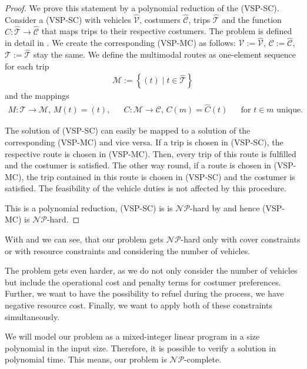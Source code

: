 \begin{proof}

We prove this statement by a polynomial reduction of the (VSP-SC). Consider a (VSP-SC) with vehicles $\hat{\mathcal{V}}$, costumers $\hat{\mathcal{C}}$, trips $\hat{\mathcal{T}}$ and the function $\hat{C}:\hat{\mathcal{T}}\to\hat{\mathcal{C}}$ that maps trips to their respective costumers. The problem is defined in detail in \cite[pp. 5-8]{Kaiser_Knoll}. We create the corresponding (VSP-MC) as follows: $\mathcal{V}:=\hat{\mathcal{V}}$, $\mathcal{C}:=\hat{\mathcal{C}}$, $\mathcal{T}:=\hat{\mathcal{T}}$ stay the same. We define the multimodal routes as one-element sequence for each trip
\begin{align*}
	\mathcal{M}:=\left\{(t)\mid t\in\hat{\mathcal{T}}\right\}
\end{align*}
and the mappings
\begin{align*}
	M:\mathcal{T}\to\mathcal{M} \text{, } M(t) = (t), && C:\mathcal{M}\to\mathcal{C} \text{, } C(m) = \hat{C}(t) && \text{for } t\in m \text{ unique.}
\end{align*}

The solution of (VSP-SC) can easily be mapped to a solution of the corresponding (VSP-MC) and vice versa. If a trip is chosen in (VSP-SC), the respective route is chosen in (VSP-MC). Then, every trip of this route is fulfilled and the costumer is satisfied. The other way round, if a route is chosen in (VSP-MC), the trip contained in this route is chosen in (VSP-SC) and the costumer is satisfied. The feasibility of the vehicle duties is not affected by this procedure.

This is a polynomial reduction, (VSP-SC) is is $\mathcal{NP}$-hard by  and hence (VSP-MC) is $\mathcal{NP}$-hard.

\end{proof}

With  and  we can see, that our problem gets $\mathcal{NP}$-hard only with cover constraints or with resource constraints and considering the number of vehicles.

The problem gets even harder, as we do not only consider the number of vehicles but include the operational cost and penalty terms for costumer preferences. Further, we want to have the possibility to refuel during the process, \ie we have negative resource cost. Finally, we want to apply both of these constraints simultaneously. 

We will model our problem as a mixed-integer linear program in a size polynomial in the input size. Therefore, it is possible to verify a solution in polynomial time. This means, our problem is $\mathcal{NP}$-complete.